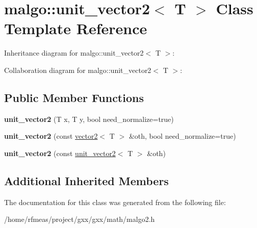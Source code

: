 \hypertarget{classmalgo_1_1unit__vector2}{}\section{malgo\+:\+:unit\+\_\+vector2$<$ T $>$ Class Template Reference}
\label{classmalgo_1_1unit__vector2}


Inheritance diagram for malgo\+:\+:unit\+\_\+vector2$<$ T $>$\+:


Collaboration diagram for malgo\+:\+:unit\+\_\+vector2$<$ T $>$\+:
\subsection*{Public Member Functions}
\begin{DoxyCompactItemize}
\item 
{\bfseries unit\+\_\+vector2} (T x, T y, bool need\+\_\+normalize=true)\hypertarget{classmalgo_1_1unit__vector2_a4173a5b2ea26d7092f380699fb023fb8}{}\label{classmalgo_1_1unit__vector2_a4173a5b2ea26d7092f380699fb023fb8}

\item 
{\bfseries unit\+\_\+vector2} (const \hyperlink{classmalgo_1_1vector2}{vector2}$<$ T $>$ \&oth, bool need\+\_\+normalize=true)\hypertarget{classmalgo_1_1unit__vector2_a8f84399dcbcd3501456e26a7f8490c01}{}\label{classmalgo_1_1unit__vector2_a8f84399dcbcd3501456e26a7f8490c01}

\item 
{\bfseries unit\+\_\+vector2} (const \hyperlink{classmalgo_1_1unit__vector2}{unit\+\_\+vector2}$<$ T $>$ \&oth)\hypertarget{classmalgo_1_1unit__vector2_a3d516ebc29079844b52005d0bc2da76f}{}\label{classmalgo_1_1unit__vector2_a3d516ebc29079844b52005d0bc2da76f}

\end{DoxyCompactItemize}
\subsection*{Additional Inherited Members}


The documentation for this class was generated from the following file\+:\begin{DoxyCompactItemize}
\item 
/home/rfmeas/project/gxx/gxx/math/malgo2.\+h\end{DoxyCompactItemize}
